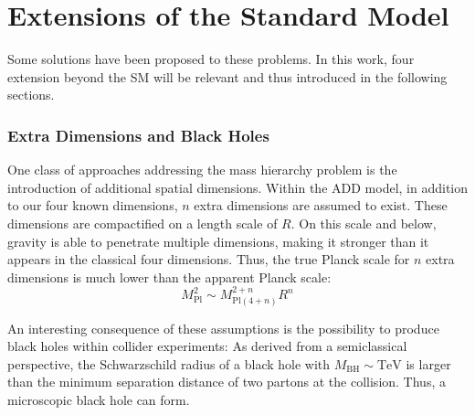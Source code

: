 
\section{Extensions of the Standard Model}
\label{sec:sm_extensions}

Some solutions have been proposed to these problems. In this work, four extension beyond the \acl{SM} will be relevant and thus introduced in the following sections.

\subsubsection{Extra Dimensions and Black Holes}
One class of approaches addressing the mass hierarchy problem is the introduction of additional spatial dimensions. Within the \acf{ADD} model\cite{Arkani-Hamed:Hierarchyproblemnew}, in addition to our four known dimensions, $n$ extra dimensions are assumed to exist. These dimensions are compactified on a length scale of $R$. On this scale and below, gravity is able to penetrate multiple dimensions, making it stronger than it appears in the classical four dimensions. Thus, the true Planck scale for $n$ extra dimensions is much lower than the apparent Planck scale:
\begin{equation}
    M_\text{Pl}^2 \sim M_{\text{Pl}(4+n)}^{2+n} R^n 
\end{equation}

An interesting consequence of these assumptions is the possibility to produce black holes within collider experiments\cite{Dimopoulos:BlackHolesLHCa}: As derived from a semiclassical perspective, the Schwarzschild radius of a black hole with $M_\text{BH} \sim \si{\TeV}$ is larger than the minimum separation distance of two partons at the collision. Thus, a microscopic black hole can form.

